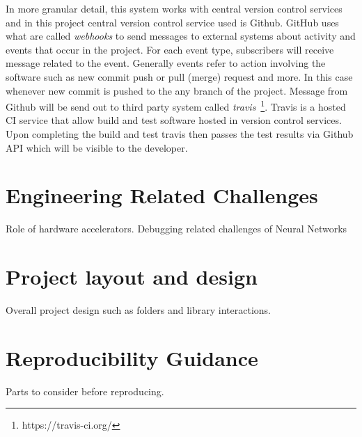 In more granular detail, this system works with central version control services and in this project central version control service used is Github. GitHub uses what are called \emph{webhooks} to send messages to external systems about activity and events that occur in the project. For each event type, subscribers will receive message related to the event. Generally events refer to action involving the software such as new commit push or pull (merge) request and more. In this case whenever new commit is pushed to the any branch of the project. Message from Github will be send out to third party system called \emph{travis}~\footnote{https://travis-ci.org/}. Travis is a hosted CI service that allow build and test software hosted in version control services. Upon completing the build and test travis then passes the test results via Github API which will be visible to the developer. 

\section{Engineering Related Challenges}
Role of hardware accelerators. Debugging related challenges of Neural Networks

\section{Project layout and design}
Overall project design such as folders and library interactions.

\section{Reproducibility Guidance}
Parts to consider before reproducing.

\clearpage